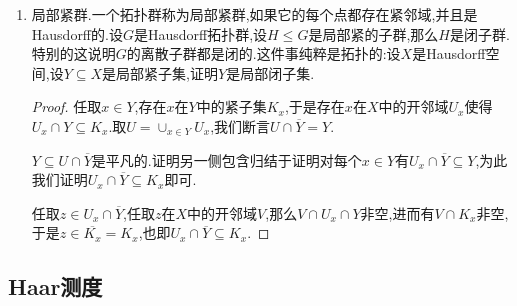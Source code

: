 \begin{enumerate}
\begin{enumerate}[(1)]
\begin{proof}
    		我们解释过子群的闭包还是子群,所以这里$H$是闭子群.另外任取$g\in G$,那么$gHg^{-1}$也是包含$\{e\}$的闭集,按照闭包的定义有$H\subseteq gHg^{-1}$,也即$H=gHg^{-1},\forall g\in G$,也即$H$是正规子群.最后我们解释过$H$是闭子群时$G/H$是Hausdorff的.
    	\end{proof}
    	\item 设$G$是Hausdorff拓扑群,设$H\le G$是紧子群,那么$\rho:G\to G/H$是闭映射.这里$H$紧性是必须的,取$G=(\mathbb{R}^2,+)$,取子群$H=\{(0,y)\mid y\in\mathbb{R}\}$,那么$G/H\cong\mathbb{R}$,商映射是$\rho(x,y)=x$.取闭集$X=\{(x,y)\in\mathbb{R}^2\mid xy=1\}$,它在商群中的像是$\rho(X)=\mathbb{R}^*$不是闭集.
    	\begin{proof}
    		
    		对于Hausdorff拓扑群$G$我们有如下事实:一个闭子集和一个紧子集的乘积总是闭的.任取$G$的闭子集$X$,它在$G/H$中的像是$XH$,要证它是$G/H$的闭集,只需验证$\rho^{-1}(XH)=XH$是$G$的闭子集,而这由我们指出的命题是成立的.
    	\end{proof}
    \end{enumerate}
    \item 局部紧群.一个拓扑群称为局部紧群,如果它的每个点都存在紧邻域,并且是Hausdorff的.设$G$是Hausdorff拓扑群,设$H\le G$是局部紧的子群,那么$H$是闭子群.特别的这说明$G$的离散子群都是闭的.这件事纯粹是拓扑的:设$X$是Hausdorff空间,设$Y\subseteq X$是局部紧子集,证明$Y$是局部闭子集.
    \begin{proof}
    	
    	任取$x\in Y$,存在$x$在$Y$中的紧子集$K_x$,于是存在$x$在$X$中的开邻域$U_x$使得$U_x\cap Y\subseteq K_x$.取$U=\cup_{x\in Y}U_x$,我们断言$U\cap\overline{Y}=Y$.
    	
    	\qquad
    	
    	$Y\subseteq U\cap\overline{Y}$是平凡的.证明另一侧包含归结于证明对每个$x\in Y$有$U_x\cap\overline{Y}\subseteq Y$,为此我们证明$U_x\cap\overline{Y}\subseteq K_x$即可.
    	
    	\qquad
    	
    	任取$z\in U_x\cap\overline{Y}$,任取$z$在$X$中的开邻域$V$,那么$V\cap U_x\cap Y$非空,进而有$V\cap K_x$非空,于是$z\in\overline{K_x}=K_x$,也即$U_x\cap\overline{Y}\subseteq K_x$.
    \end{proof}
\end{enumerate}
\newpage
\subsection{Haar测度}

